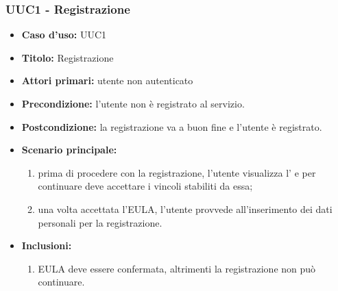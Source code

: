 \documentclass[casi-duso]{subfiles}
\begin{document}
\subsubsection{UUC1 - Registrazione}%
\label{subsub:UUC1utente}
\begin{itemize}
  \item \textbf{Caso d’uso:} UUC1
  \item \textbf{Titolo:} Registrazione
  \item \textbf{Attori primari:} utente non autenticato
  \item \textbf{Precondizione:} l'utente non è registrato al servizio.
  \item \textbf{Postcondizione:} la registrazione va a buon fine e l'utente è registrato.
  \item \textbf{Scenario principale:}
        \begin{enumerate}
          \item prima di procedere con la registrazione, l'utente visualizza l' e per continuare deve accettare i vincoli stabiliti da essa;
          \item una volta accettata l'EULA, l'utente provvede all'inserimento dei dati personali per la registrazione.
        \end{enumerate}
  \item \textbf{Inclusioni:}
        \begin{enumerate}
          \item EULA deve essere confermata, altrimenti la registrazione non può continuare.
        \end{enumerate}
\end{itemize}

\end{document}
